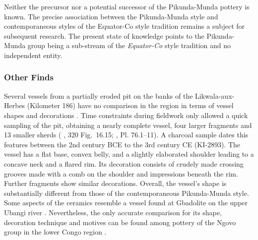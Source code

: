 \documentclass[smallextended,natbib]{svjour3}       %
\begin{document}
Neither the precursor nor a potential successor of the Pikunda-Munda pottery is known. The precise association between the Pikunda-Munda style and contemporaneous styles of the Equator-Co style tradition remains a subject for subsequent research. The present state of knowledge points to the Pikunda-Munda group being a sub-stream of the \textit{Equator-Co} style tradition and no independent entity.

\subsubsection*{Other Finds}

Several vessels from a partially eroded pit on the banks of the Likwala-aux-Herbes (Kilometer 186) have no comparison in the region in terms of vessel shapes and decorations \citep[165--168, 339--340]{Seidensticker.2021e}. Time constraints during fieldwork only allowed a quick sampling of the pit, obtaining a nearly complete vessel, four larger fragments and 13 smaller sherds (\citeauthor{Eggert.1993} \citeyear{Eggert.1993}, 320 Fig.~16.15; \citeauthor{Seidensticker.2021e} \citeyear{Seidensticker.2021e}, Pl. 76.1--11). A charcoal sample dates this features between the 2nd century BCE to the 3rd century CE (KI-2893). The vessel has a flat base, convex belly, and a slightly elaborated shoulder leading to a concave neck and a flared rim. Its decoration consists of crudely made crossing grooves made with a comb on the shoulder and impressions beneath the rim. Further fragments show similar decorations. Overall, the vessel's shape is substantially different from those of the contemporaneous Pikunda-Munda style. Some aspects of the ceramics resemble a vessel found at Gbadolite on the upper Ubangi river \citep[277-278 Fig. 7]{Eggert.1984}. Nevertheless, the only accurate comparison for its shape, decoration technique and motives can be found among pottery of the Ngovo group in the lower Congo region \citep{deMaret.1986}.
\end{document}
